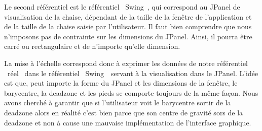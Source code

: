 \documentclass{polytech/polytech}
\begin{document}
Le second référentiel est le référentiel \guillemotleft ~Swing~\guillemotright , qui correspond au JPanel de visualisation de la chaise, dépendant de la taille de la fenêtre de l'application et de la taille de la chaise saisie par l'utilisateur. 
Il faut bien comprendre que nous n'imposons pas de contrainte sur les dimensions du JPanel. Ainsi, il pourra être carré ou rectangulaire et de n'importe qu'elle dimension.


La mise à l'échelle correspond donc à exprimer les données de notre référentiel \guillemotleft ~réel \guillemotright\ dans le référentiel \guillemotleft\ Swing~\guillemotright\  servant à la visualisation dans le JPanel. 
L'idée est que, peut importe la forme du JPanel et les dimensions de la fenêtre, le barycentre, la deadzone et les pieds se comporte toujours de la même façon.
 Nous avons cherché à garantir que si l'utilisateur voit le barycentre sortir de la deadzone alors en réalité c'est bien parce que son centre de gravité sors de la deadzone et non à cause une mauvaise implémentation de l'interface graphique.
 
\end{document}
